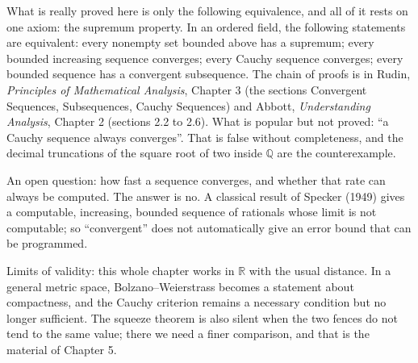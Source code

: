 \begin{untukpeneliti}
What is really proved here is only the following equivalence, and all of it rests on one
axiom: the supremum property. In an ordered field, the following statements are
equivalent: every nonempty set bounded above has a supremum; every bounded increasing
sequence converges; every Cauchy sequence converges; every bounded sequence has a
convergent subsequence. The chain of proofs is in Rudin, \emph{Principles of Mathematical
Analysis}, Chapter 3 (the sections Convergent Sequences, Subsequences, Cauchy Sequences)
and Abbott, \emph{Understanding Analysis}, Chapter 2 (sections 2.2 to 2.6). What is
popular but not proved: ``a Cauchy sequence always converges''. That is false without
completeness, and the decimal truncations of the square root of two inside
$\mathbb{Q}$ are the counterexample.

An open question: how fast a sequence converges, and whether that rate can always be
computed. The answer is no. A classical result of Specker (1949) gives a computable,
increasing, bounded sequence of rationals whose limit is not computable; so
``convergent'' does not automatically give an error bound that can be programmed.

Limits of validity: this whole chapter works in $\mathbb{R}$ with the usual distance. In
a general metric space, Bolzano--Weierstrass becomes a statement about compactness, and
the Cauchy criterion remains a necessary condition but no longer sufficient. The squeeze
theorem is also silent when the two fences do not tend to the same value; there we need a
finer comparison, and that is the material of Chapter 5.
\end{untukpeneliti}

